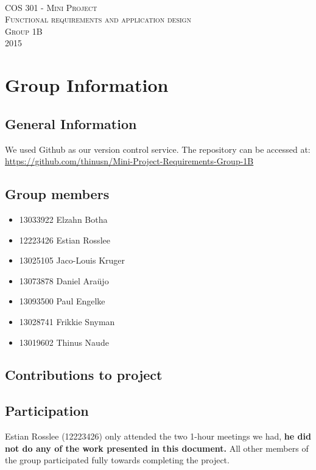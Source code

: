 \documentclass [a4paper,12pt] {article}
\begin{document}
\begin{titlepage}
	\begin{center}
		\textsc{\huge\\[5cm] COS 301 - Mini Project}\\[1cm]
		\textsc{\huge Functional requirements and application design}\\[1cm]
		\textsc{\huge Group 1B}\\[1cm]
		\textsc{\large 2015}
	\end{center}
\end{titlepage}
\tableofcontents
\pagebreak
\section{Group Information}
	\subsection{General Information}
	We used Github as our version control service. The repository can be accessed at: \linebreak \url{https://github.com/thinusn/Mini-Project-Requirements-Group-1B}
	\subsection{Group members}
	\begin{itemize}
		\item 13033922 Elzahn Botha
		\item 12223426 Estian Rosslee
		\item 13025105 Jaco-Louis Kruger
		\item 13073878 Daniel Araüjo
		\item 13093500 Paul Engelke
		\item 13028741 Frikkie Snyman
		\item 13019602 Thinus Naude
	\end{itemize}
	\subsection{Contributions to project}
	\subsection*{Participation}
	Estian Rosslee (12223426) only attended the two 1-hour meetings we had, \textbf{he did not do any of the work presented in this document.} All other members of the group participated fully towards completing the project.
\end{document}
